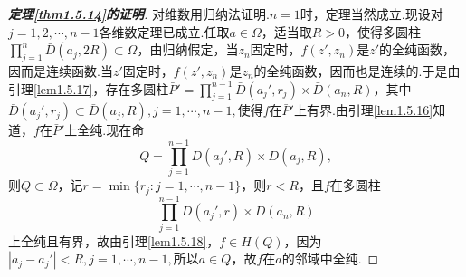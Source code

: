 \begin{proof}[\textbf{定理\ref{thm1.5.14}的证明}]
	对维数用归纳法证明.$n=1$时，定理当然成立.现设对$j=1,2,\cdots,n-1$各维数定理已成立.任取$a\in\Omega$，适当取$R>0$，使得多圆柱$\prod\limits_{j=1}^n \bar{D}(a_j,2R)\subset\Omega$，由归纳假定，当$z_n$固定时，$f(z',z_n)$是$z'$的全纯函数，因而是连续函数.当$z'$固定时，$f(z',z_n)$是$z_n$的全纯函数，因而也是连续的.于是由引理\ref{lem1.5.17}，存在多圆柱$\bar{P}'=\prod\limits_{j=1}^{n-1}\bar{D}(a_j',r_j)\times\bar{D}(a_n,R)$，其中$\bar{D}(a_j',r_j)\subset\bar{D}(a_j,R),j=1,\cdots,n-1,$使得$f$在$\bar{P}'$上有界.由引理\ref{lem1.5.16}知道，$f$在$\bar{P}'$上全纯.现在命
	\[Q=\prod_{j=1}^{n-1}D(a_j',R)\times D(a_j,R),\]
	则$Q\subset\Omega$，记$r=\min\{r_j\colon j=1,\cdots,n-1\}$，则$r<R$，且$f$在多圆柱
	\[\prod_{j=1}^{n-1}D(a_j',r)\times D(a_n,R)\]
	上全纯且有界，故由引理\ref{lem1.5.18}，$f\in H(Q)$，因为$|a_j-a_j'|<R,j=1,\cdots,n-1,$所以$a\in Q$，故$f$在$a$的邻域中全纯.
\end{proof}
